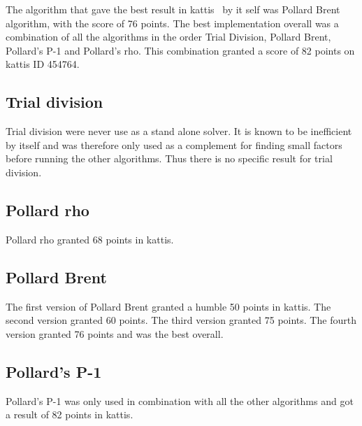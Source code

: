 The algorithm that gave the best result in kattis~\cite{kattis} by it self was Pollard Brent algorithm, with the score of 76 points. The best implementation overall was a combination of all the algorithms in the order Trial Division, Pollard Brent, Pollard's P-1 and Pollard's rho. This combination granted a score of 82 points on kattis ID 454764.

\subsection{Trial division}

Trial division were never use as a stand alone solver. It is known to be inefficient by itself and was therefore only used as a complement for finding small factors before running the other algorithms. Thus there is no specific result for trial division.

\subsection{Pollard rho}

Pollard rho granted 68 points in kattis.

\subsection{Pollard Brent}

The first version of Pollard Brent granted a humble 50 points in kattis. The second version granted 60 points. The third version granted 75 points. The fourth version granted 76 points and was the best overall.

\subsection{Pollard's P-1}

Pollard's P-1 was only used in combination with all the other algorithms and got a result of 82 points in kattis.

